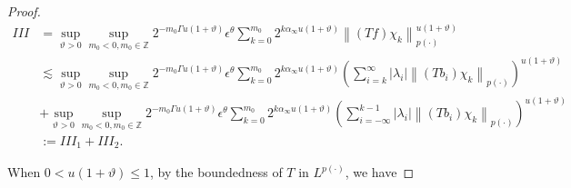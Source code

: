 \documentclass[oneside,reqno]{amsart}
\numberwithin{equation}{section}
\theoremstyle{definition}
\begin{document}
\begin{proof}
\begin{align*}
I I I&=  \sup_{\vartheta>0 }\sup _{m_0<0, m_0\in  \mathbb{Z}} 2^{-m_0\Gamma u(1+\vartheta)} \epsilon  ^\theta \sum_{k=0}^{m_0} 2^{k  \alpha_{\infty}u(1+\vartheta)}\left\|(T f) \chi_{k}\right\|_{{p(\cdot)}}^{u(1+\vartheta)} \\
& \lesssim \sup_{\vartheta>0 }\sup _{m_0<0, m_0\in  \mathbb{Z}} 2^{-m_0\Gamma u(1+\vartheta)} \epsilon  ^\theta \sum_{k=0}^{m_0} 2^{k  \alpha_{\infty}u(1+\vartheta)}\left(\sum_{i=k}^{\infty}\left|\lambda_{i}\right|\left\|\left(T b_{i}\right) \chi_{k}\right\|_{{p(\cdot)}}\right)^{u(1+\vartheta)} \\
& +\sup_{\vartheta>0 }\sup _{m_0<0, m_0\in  \mathbb{Z}} 2^{-m_0\Gamma u(1+\vartheta)} \epsilon  ^\theta \sum_{k=0}^{m_0} 2^{k  \alpha_{\infty}u(1+\vartheta)}\left(\sum_{i=-\infty}^{k-1}\left|\lambda_{i}\right|\left\|\left(T b_{i}\right) \chi_{k}\right\|_{{p(\cdot)}}\right)^{u(1+\vartheta)} \\
& :=I I I_{1}+I I I_{2} . \tag{89}
\end{align*}


When $0<u(1+\vartheta) \leq  1$, by the boundedness of $T$ in $L^{p(\cdot)}$, we have



\end{proof}
\end{document}
